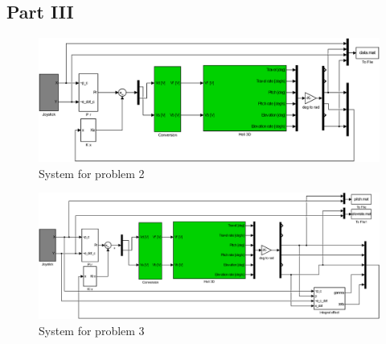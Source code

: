\subsection{Part III}
\begin{figure}[H]
    \begin{center}
    \includegraphics[width=1\linewidth]{Part3_pictures/p3p2sys.eps}
    \caption{System for problem 2}
    \label{sim:u=p3p2}
    \end{center}
\end{figure}

\begin{figure}[H]
    \begin{center}
    \includegraphics[width=1\linewidth]{Part3_pictures/p3p3sys.eps}
    \caption{System for problem 3}
    \end{center}
\end{figure}

